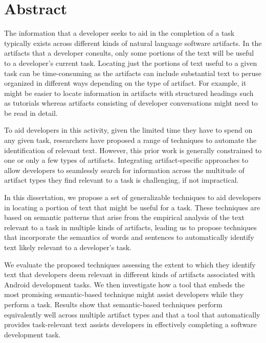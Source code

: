 

\chapter*{Abstract}

The information that a developer seeks to aid in the completion of a task typically exists across different kinds of natural language software artifacts. In the artifacts that a developer consults, only some portions of the text will be useful to a developer's current task. Locating just the portions of text useful to a given task can be time-consuming as the artifacts can include substantial text to peruse organized in different ways depending on the type of artifact. For example, it might be easier to locate information
in artifacts with structured headings such as tutorials whereas artifacts consisting of developer conversations might need to be read in detail. 

To aid developers in this activity, given the limited time they have to spend on any given task, researchers have proposed a range of techniques to automate the identification of relevant text. 
However, this prior work is generally constrained to one or only a few types of artifacts.  Integrating artifact-specific approaches to allow developers to seamlessly search for information across the multitude of artifact types they find relevant to a task is challenging, if not impractical.

In this dissertation, we propose a set of generalizable techniques to aid developers in locating a portion of text that might be useful for a task. These techniques are based on semantic patterns that arise from the empirical analysis of the text relevant to a task in multiple kinds of artifacts, leading us to propose techniques that incorporate the semantics of words and sentences to automatically identify text likely relevant to a developer's task.

We evaluate the proposed techniques assessing the extent to which they identify text that developers deem relevant in different kinds of artifacts associated with Android development tasks. We then investigate how a tool that embeds the most promising semantic-based technique might assist developers while they perform a task. Results show that semantic-based techniques perform equivalently well across multiple artifact types and that a tool that automatically provides task-relevant text assists developers in effectively completing a software development task.
    

